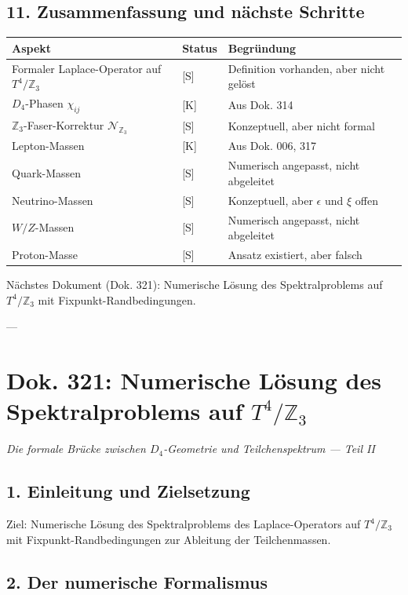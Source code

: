 \documentclass[11pt,a4paper]{article}
\begin{document}
	\subsection{11. Zusammenfassung und nächste Schritte}
	\begin{longtable}{lll}
		\toprule
		\textbf{Aspekt} & \textbf{Status} & \textbf{Begründung} \\
		\midrule
		\endhead
		\bottomrule
		\endfoot
		Formaler Laplace-Operator auf $T^4/\mathbb{Z}_3$ & [S] & Definition vorhanden, aber nicht gelöst \\
		$D_4$-Phasen $\chi_{ij}$ & [K] & Aus Dok. 314 \\
		$\mathbb{Z}_3$-Faser-Korrektur $\mathcal{N}_{\mathbb{Z}_3}$ & [S] & Konzeptuell, aber nicht formal \\
		Lepton-Massen & [K] & Aus Dok. 006, 317 \\
		Quark-Massen & [S] & Numerisch angepasst, nicht abgeleitet \\
		Neutrino-Massen & [S] & Konzeptuell, aber $\epsilon$ und $\xi$ offen \\
		$W/Z$-Massen & [S] & Numerisch angepasst, nicht abgeleitet \\
		Proton-Masse & [S] & Ansatz existiert, aber falsch \\
	\end{longtable}
	
	Nächstes Dokument (Dok. 321): Numerische Lösung des Spektralproblems auf $T^4/\mathbb{Z}_3$ mit Fixpunkt-Randbedingungen.
	
	---
	
	\section{Dok. 321: Numerische Lösung des Spektralproblems auf $T^4/\mathbb{Z}_3$}
	\textit{Die formale Brücke zwischen $D_4$-Geometrie und Teilchenspektrum — Teil II}
	
	\subsection{1. Einleitung und Zielsetzung}
	Ziel: Numerische Lösung des Spektralproblems des Laplace-Operators auf $T^4/\mathbb{Z}_3$ mit Fixpunkt-Randbedingungen zur Ableitung der Teilchenmassen.
	
	\subsection{2. Der numerische Formalismus}
\end{document}

